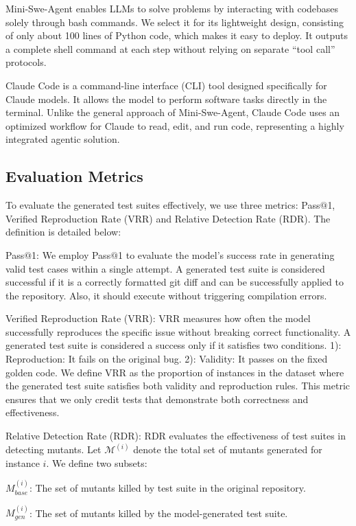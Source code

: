 \documentclass[11pt]{article}
\begin{document}
Mini-Swe-Agent enables LLMs to solve problems by interacting with codebases solely through bash commands. We select it for its lightweight design, consisting of only about 100 lines of Python code, which makes it easy to deploy. It outputs a complete shell command at each step without relying on separate ``tool call'' protocols.

Claude Code is a command-line interface (CLI) tool designed specifically for Claude models. It allows the model to perform software tasks directly in the terminal. Unlike the general approach of Mini-Swe-Agent, Claude Code uses an optimized workflow for Claude to read, edit, and run code, representing a highly integrated agentic solution.

\subsection{Evaluation Metrics} 
\label{sec:metrics}

To evaluate the generated test suites effectively, we use three metrics: Pass$@$1, Verified Reproduction Rate (VRR) and Relative Detection Rate (RDR). The definition is detailed below:

Pass$@$1:
We employ Pass$@$1 to evaluate the model's success rate in generating valid test cases within a single attempt. A generated test suite is considered successful if it is a correctly formatted git diff and can be successfully applied to the repository. Also, it should execute without triggering compilation errors.

Verified Reproduction Rate (VRR):
VRR measures how often the model successfully reproduces the specific issue without breaking correct functionality. A generated test suite is considered a success only if it satisfies two conditions. 1): Reproduction: It fails on the original bug. 2): Validity: It passes on the fixed golden code. We define VRR as the proportion of instances in the dataset where the generated test suite satisfies both validity and reproduction rules. This metric ensures that we only credit tests that demonstrate both correctness and effectiveness.

Relative Detection Rate (RDR):
RDR evaluates the effectiveness of test suites in detecting mutants. Let $\mathcal{M}^{(i)}$ denote the total set of mutants generated for instance $i$. We define two subsets:

 $M_{base}^{(i)}$: The set of mutants killed by test suite in the original repository.
 
$M_{gen}^{(i)}$: The set of mutants killed by the model-generated test suite.
\end{document}
